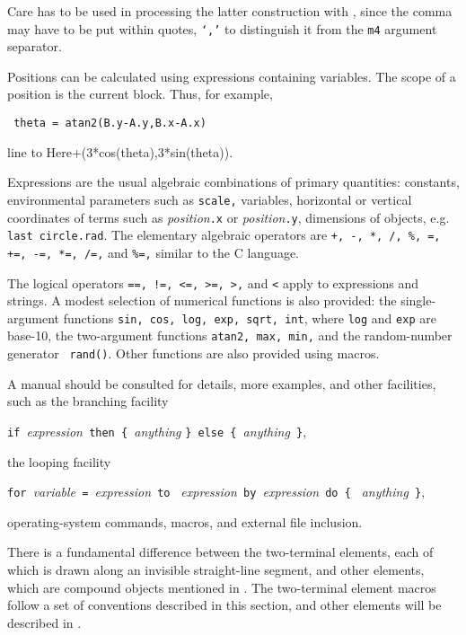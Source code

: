 \noindent%
Care has to be used in processing the latter construction with \Mfour,
since the comma may have to be put within quotes, {\tt `,'}
to distinguish it from the {\tt m4} argument separator.

Positions can be calculated using expressions containing variables.
The scope of a position is the current block.  Thus, for example,

{\tt
  theta = atan2(B.y-A.y,B.x-A.x)

  line to Here+(3*cos(theta),3*sin(theta)).
  }

Expressions are the usual algebraic combinations of primary quantities:
constants, environmental parameters such as {\tt scale,} variables,
horizontal or vertical coordinates of terms such as
{\sl position}{\tt.x} or {\sl position}{\tt.y},
dimensions of \pic objects, e.g. {\tt last circle.rad}.
The elementary algebraic operators are
{\tt +, -, *, /, \%, =, +=, -=, *=, /=,} and {\tt \%=,}
similar to the C language.

The logical operators {\tt ==, !=, <=, >=, >,} and {\tt <} apply to
expressions and strings.  A modest selection of numerical functions is
also provided: the single-argument functions {\tt sin, cos, log, exp,
sqrt, int}, where {\tt log} and {\tt exp} are base-10, the two-argument
functions {\tt atan2, max, min,} and the random-number generator {\tt
rand()}.  Other functions are also provided using macros.

A \pic manual should be consulted for details, more examples, and
other facilities, such as the branching facility

\verb|if |{\sl expression}\verb| then { |{\sl anything} 
  \verb|} else { |{\sl anything}\verb| }|,

\noindent%
the looping facility

\verb|for |{\sl variable}\verb| = |{\sl expression}\verb| to |%
{\sl expression}\verb| by |{\sl expression}\verb| do { |%
{\sl anything}\verb| }|,

\noindent%
operating-system commands, \pic macros, and external file inclusion.

There is a fundamental difference between the two-terminal elements, each
of which is drawn along an invisible straight-line segment,
and other elements, which are compound objects mentioned
in .  The two-terminal element macros follow a
set of conventions described in this section, and other elements will
be described in .

